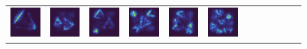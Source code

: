 \documentclass[letterpaper]{article} %
\begin{document}
\begin{figure}[!htbp]
\begin{tabular}{cccccccccccc}
\multicolumn{1}{c}{\includegraphics[width=0.125\columnwidth]{saliency/hrr/circle/triangle_1.png}} \hspace{-12pt} &  
\multicolumn{1}{c}{\includegraphics[width=0.125\columnwidth]{saliency/hrr/circle/triangle_2.png}} \hspace{-12pt} & 
\multicolumn{1}{c}{\includegraphics[width=0.125\columnwidth]{saliency/hrr/circle/triangle_3.png}} \hspace{-12pt} & 
\multicolumn{1}{c}{\includegraphics[width=0.125\columnwidth]{saliency/hrr/circle/triangle_4.png}} \hspace{-12pt} & 
\multicolumn{1}{c}{\includegraphics[width=0.125\columnwidth]{saliency/hrr/circle/triangle_5.png}} \hspace{-12pt} & 
\multicolumn{1}{c}{\includegraphics[width=0.125\columnwidth]{saliency/hrr/circle/triangle_6.png}} \hspace{-12pt} &

\end{tabular}
\end{figure}
\end{document}
